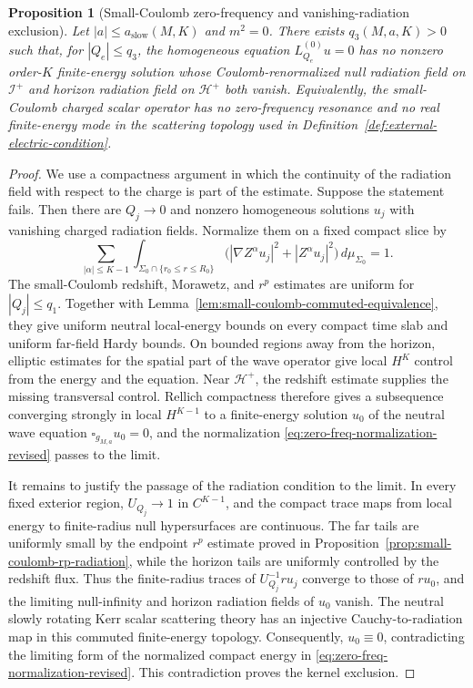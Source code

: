 \documentclass[11pt]{article}
\numberwithin{equation}{section}
\theoremstyle{plain}
\newtheorem{proposition}[theorem]{Proposition}
\theoremstyle{definition}
\theoremstyle{remark}
\begin{document}
\begin{proposition}[Small-Coulomb zero-frequency and vanishing-radiation exclusion]\label{prop:small-coulomb-zero-frequency-exclusion}
Let \(|a|\le a_{\mathrm{slow}}(M,K)\) and \(m^2=0\).  There exists \(q_3(M,a,K)>0\) such that, for \(|Q_e|\le q_3\), the homogeneous equation \(L_{Q_e}^{(0)}u=0\) has no nonzero order-\(K\) finite-energy solution whose Coulomb-renormalized null radiation field on \(\mathcal I^+\) and horizon radiation field on \(\mathcal H^+\) both vanish.  Equivalently, the small-Coulomb charged scalar operator has no zero-frequency resonance and no real finite-energy mode in the scattering topology used in Definition~\ref{def:external-electric-condition}.
\end{proposition}

\begin{proof}

We use a compactness argument in which the continuity of the radiation field with respect to the charge is part of the estimate.  Suppose the statement fails.  Then there are \(Q_j\to0\) and nonzero homogeneous solutions \(u_j\) with vanishing charged radiation fields.  Normalize them on a fixed compact slice by
\begin{equation}\label{eq:zero-freq-normalization-revised}
 \sum_{|\alpha|\le K-1}\int_{\Sigma_0\cap\{r_0\le r\le R_0\}}
 \bigl(|\nabla Z^\alpha u_j|^2+|Z^\alpha u_j|^2\bigr)\,d\mu_{\Sigma_0}=1.
\end{equation}
The small-Coulomb redshift, Morawetz, and \(r^p\) estimates are uniform for \(|Q_j|\le q_1\).  Together with Lemma~\ref{lem:small-coulomb-commuted-equivalence}, they give uniform neutral local-energy bounds on every compact time slab and uniform far-field Hardy bounds.  On bounded regions away from the horizon, elliptic estimates for the spatial part of the wave operator give local \(H^K\) control from the energy and the equation.  Near \(\mathcal H^+\), the redshift estimate supplies the missing transversal control.  Rellich compactness therefore gives a subsequence converging strongly in local \(H^{K-1}\) to a finite-energy solution \(u_0\) of the neutral wave equation \(\square_{g_{M,a}}u_0=0\), and the normalization \eqref{eq:zero-freq-normalization-revised} passes to the limit.

It remains to justify the passage of the radiation condition to the limit.  In every fixed exterior region, \(U_{Q_j}\to1\) in \(C^{K-1}\), and the compact trace maps from local energy to finite-radius null hypersurfaces are continuous.  The far tails are uniformly small by the endpoint \(r^p\) estimate proved in Proposition~\ref{prop:small-coulomb-rp-radiation}, while the horizon tails are uniformly controlled by the redshift flux.  Thus the finite-radius traces of \(U_{Q_j}^{-1}ru_j\) converge to those of \(ru_0\), and the limiting null-infinity and horizon radiation fields of \(u_0\) vanish.  The neutral slowly rotating Kerr scalar scattering theory has an injective Cauchy-to-radiation map in this commuted finite-energy topology.  Consequently, \(u_0\equiv0\), contradicting the limiting form of the normalized compact energy in \eqref{eq:zero-freq-normalization-revised}.  This contradiction proves the kernel exclusion.


\end{proof}
\end{document}
